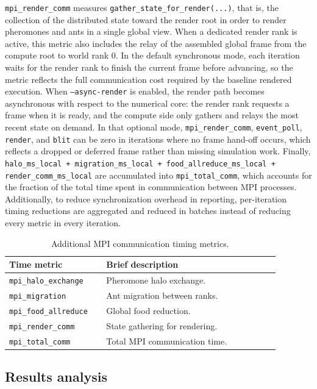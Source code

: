 \texttt{mpi\_render\_comm} measures \texttt{gather\_state\_for\_render(...)}, that is, the collection of the distributed state toward the render root in order to render pheromones and ants in a single global view. When a dedicated render rank is active, this metric also includes the relay of the assembled global frame from the compute root to world rank 0. In the default synchronous mode, each iteration waits for the render rank to finish the current frame before advancing, so the metric reflects the full communication cost required by the baseline rendered execution. When \texttt{--async-render} is enabled, the render path becomes asynchronous with respect to the numerical core: the render rank requests a frame when it is ready, and the compute side only gathers and relays the most recent state on demand. In that optional mode, \texttt{mpi\_render\_comm}, \texttt{event\_poll}, \texttt{render}, and \texttt{blit} can be zero in iterations where no frame hand-off occurs, which reflects a dropped or deferred frame rather than missing simulation work. Finally, \texttt{halo\_ms\_local + migration\_ms\_local + food\_allreduce\_ms\_local + render\_comm\_ms\_local} are accumulated into \texttt{mpi\_total\_comm}, which accounts for the fraction of the total time spent in communication between MPI processes. Additionally, to reduce synchronization overhead in reporting, per-iteration timing reductions are aggregated and reduced in batches instead of reducing every metric in every iteration.

\begin{table}[htbp]
\centering
\caption{Additional MPI communication timing metrics.}
\label{tab:mpi_timing_summary}
\begin{tabular}{p{0.30\linewidth} p{0.58\linewidth}}
\hline
\textbf{Time metric} & \textbf{Brief description} \\
\hline
\texttt{mpi\_halo\_exchange} & Pheromone halo exchange. \\
\texttt{mpi\_migration} & Ant migration between ranks. \\
\texttt{mpi\_food\_allreduce} & Global food reduction. \\
\texttt{mpi\_render\_comm} & State gathering for rendering. \\
\texttt{mpi\_total\_comm} & Total MPI communication time. \\
\hline
\end{tabular}
\end{table}

\subsection{Results analysis}

